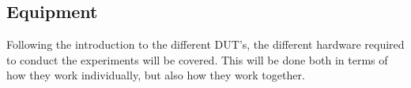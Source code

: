 \subsection{Equipment}

Following the introduction to the different DUT's, the different hardware required to conduct the experiments will be covered. This will be done both in terms of how they work individually, but also how they work together.





